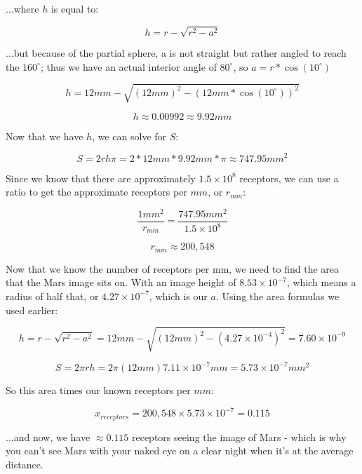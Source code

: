 \documentclass{article}
\begin{document}
\noindent ...where $h$ is equal to:

\begin{equation}
    h=r - \sqrt{r^2 - a^2}
\end{equation}

\noindent ...but because of the partial sphere, a is not straight but rather angled to reach the $160^\circ$; thus we have an actual interior angle of $80^\circ$, so $a=r*\cos(10^\circ)$

\begin{equation}
    h = 12mm-\sqrt{(12mm)^2 - (12mm * \cos(10^\circ))^2}
\end{equation}

\begin{equation}
    h \approx 0.00992 \approx 9.92mm 
\end{equation}

\noindent Now that we have $h$, we can solve for $S$:

\begin{equation}
    S = 2rh\pi = 2*12mm*9.92mm*\pi \approx 747.95 mm^2
\end{equation}

\noindent Since we know that there are approximately $1.5\times10^8$ receptors, we can use a ratio to get the approximate receptors per $mm$, or $r_{mm}$:

\begin{equation}
    \frac{1mm^2}{r_{mm}} = \frac{747.95mm^2}{1.5\times 10^8}
\end{equation}

\begin{equation}
    r_{mm} \approx 200,548
\end{equation}

\noindent Now that we know the number of receptors per mm, we need to find the area that the Mars image sits on. With an image height of $8.53\times10^{-7}$, which means a radius of half that, or $4.27\times10^{-7}$, which is our $a$. Using the area formulas we used earlier:

\begin{equation}
    h = r - \sqrt{r^2 - a^2} = 12mm - \sqrt{(12mm)^2 - (4.27\times10^{-4})^2} = 7.60\times10^{-9}
\end{equation}

\begin{equation}
    S = 2 \pi r h = 2 \pi (12mm) {7.11\times10^{-7}mm} = 5.73\times10^{-7} mm^2
\end{equation}

\noindent So this area times our known receptors per $mm$:

\begin{equation}
    x_{receptors} = 200,548 \times 5.73\times10^{-7} = 0.115
\end{equation}

\noindent ...and now, we have $\approx 0.115$ receptors seeing the image of Mars - which is why you can't see Mars with your naked eye on a clear night when it's at the average distance.
\end{document}
